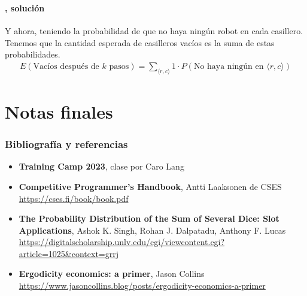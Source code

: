 \documentclass{beamer}
\begin{document}
\begin{frame}
  \frametitle{\SECTIONC}
  \framesubtitle{\EJD, solución}

  Y ahora, teniendo la probabilidad de que no haya ningún robot en cada casillero. Tenemos que la cantidad esperada de casilleros vacíos es la suma de estas probabilidades. \pause 
  \begin{gather*}
    E(\text{Vacíos después de \(k\) pasos}) = \sum_{\langle r, c \rangle}1 \cdot P(\text{No haya ningún en } \langle r, c \rangle)
  \end{gather*}
\end{frame}

\section{Notas finales}

\begin{frame}
  \frametitle{Bibliografía y referencias}
  
  \begin{itemize}
  \item \textbf{Training Camp 2023}, clase por Caro Lang \\
  \item \textbf{Competitive Programmer's Handbook}, Antti Laaksonen de CSES \\
      \href{https://cses.fi/book/book.pdf}{https://cses.fi/book/book.pdf}
  \item \textbf{The Probability Distribution of the Sum of Several Dice: Slot Applications}, Ashok K. Singh, Rohan J. Dalpatadu, Anthony F. Lucas \\
      \href{https://digitalscholarship.unlv.edu/cgi/viewcontent.cgi?article=1025&context=grrj}{https://digitalscholarship.unlv.edu/cgi/viewcontent.cgi?article=1025\&context=grrj}
    \item \textbf{Ergodicity economics: a primer}, Jason Collins \\
      \href{https://www.jasoncollins.blog/posts/ergodicity-economics-a-primer}{https://www.jasoncollins.blog/posts/ergodicity-economics-a-primer}
  \end{itemize}
\end{frame}
\end{document}
